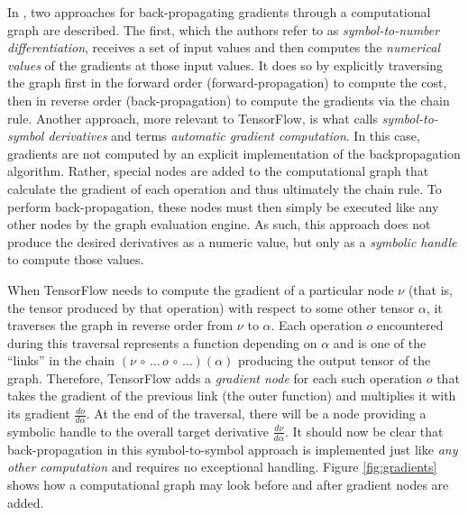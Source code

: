 In \cite{goodfellow2016}, two approaches for back-propagating gradients through
a computational graph are described. The first, which the authors refer to as
\emph{symbol-to-number differentiation}, receives a set of input values and then
computes the \emph{numerical values} of the gradients at those input values. It
does so by explicitly traversing the graph first in the forward order
(forward-propagation) to compute the cost, then in reverse order
(back-propagation) to compute the gradients via the chain rule. Another
approach, more relevant to TensorFlow, is what \cite{goodfellow2016} calls
\emph{symbol-to-symbol derivatives} and \cite{tensorflow} terms \emph{automatic
  gradient computation}. In this case, gradients are not computed by an explicit
implementation of the backpropagation algorithm. Rather, special nodes are added
to the computational graph that calculate the gradient of each operation and
thus ultimately the chain rule. To perform back-propagation, these nodes must
then simply be executed like any other nodes by the graph evaluation engine. As
such, this approach does not produce the desired derivatives as a numeric value,
but only as a \emph{symbolic handle} to compute those values.

When TensorFlow needs to compute the gradient of a particular node $\nu$ (that
is, the tensor produced by that operation) with respect to some other tensor
$\alpha$, it traverses the graph in reverse order from $\nu$ to $\alpha$. Each
operation $o$ encountered during this traversal represents a function depending
on $\alpha$ and is one of the ``links'' in the chain
$(\nu \,\circ\, \dots\, o \,\circ\, \dots)(\alpha)$ producing the output tensor
of the graph. Therefore, TensorFlow adds a \emph{gradient node} for each such
operation $o$ that takes the gradient of the previous link (the outer function)
and multiplies it with its gradient $\frac{do}{d\alpha}$. At the end of the
traversal, there will be a node providing a symbolic handle to the overall
target derivative $\frac{d\nu}{d\alpha}$. It should now be clear that
back-propagation in this symbol-to-symbol approach is implemented just like
\emph{any other computation} and requires no exceptional handling. Figure
\ref{fig:gradients} shows how a computational graph may look before and after
gradient nodes are added.

